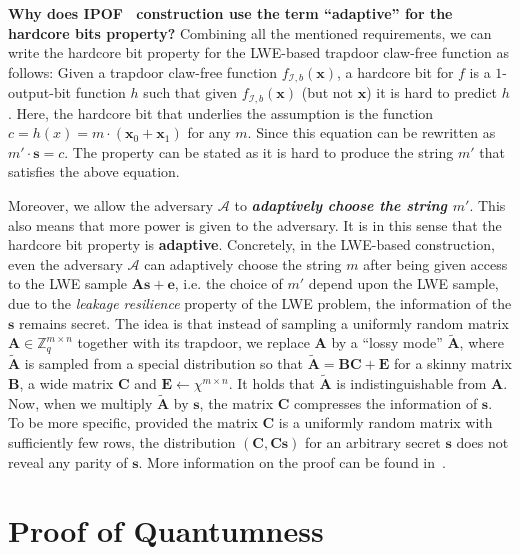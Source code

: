 \documentclass[cryptography,review,submit,pdftex,moreauthors,amsmath,amssymb,aps,strict]{Definitions/mdpi}
\begin{document}
\noindent\textbf{Why does IPOF~\cite{Brakerski18_Interactiveproofofquantumness} construction use the term ``adaptive'' for the hardcore bits property?}
Combining all the mentioned requirements, we can write the hardcore bit property for the LWE-based trapdoor claw-free function as follows:
Given a trapdoor claw-free function $f_{\mathcal{I},b}(\mathbf{x})$, a hardcore bit for $f$ is a $1$-output-bit function $h$ such that given  $f_{\mathcal{I},b}(\mathbf{x})$ (but not $\mathbf{x}$) it is hard to predict $h$. Here, the hardcore bit that underlies the assumption is the function $c = h(x)= m\cdot (\mathbf{x}_0 + \mathbf{x}_1)$ for any $m$.
Since this equation can be rewritten as $m'\cdot \mathbf{s} =c$. The property can be stated as it is hard to produce the string $m'$ that satisfies the above equation.

Moreover, we allow the adversary $\mathcal{A}$ to \textbf{\textit{adaptively choose the string $m'$}}. This also means that more power is given to the adversary. It is in this sense that the hardcore bit property is \textbf{adaptive}. Concretely, in the LWE-based construction, even the adversary $\mathcal{A}$ can adaptively choose the string $m$ after being given access to the LWE sample $\mathbf{A}\mathbf{s}+\mathbf{e}$, i.e. the choice of $m'$ depend upon the LWE sample, due to the \textit{leakage resilience} property of the LWE problem, the information of the $\mathbf{s}$ remains secret. The idea is that instead of sampling a uniformly random matrix $\mathbf{A}\in\mathbb{Z}^{m\times n}_q$ together with its trapdoor, we replace $\mathbf{A}$ by a ``lossy mode'' $\tilde{\mathbf{A}}$, where $\tilde{\mathbf{A}}$ is sampled from a special distribution so that $\tilde{\mathbf{A}}=\mathbf{B}\mathbf{C}+\mathbf{E}$ for a skinny matrix $\mathbf{B}$, a wide matrix $\mathbf{C}$ and $\mathbf{E}\gets\chi^{m\times n}$. It holds that $\tilde{\mathbf{A}}$ is indistinguishable from $\mathbf{A}$. Now, when we multiply $\tilde{\mathbf{A}}$ by $\mathbf{s}$, the matrix $\mathbf{C}$ compresses the information of $\mathbf{s}$. To be more specific, provided the matrix $\mathbf{C}$ is a uniformly random matrix with sufficiently few rows, the distribution $(\mathbf{C},\mathbf{C}\mathbf{s})$ for an arbitrary secret $\mathbf{s}$ does not reveal any parity of $\mathbf{s}$. More information on the proof can be found in~\cite{Brakerski18_Interactiveproofofquantumness}.

\section{Proof of Quantumness} \label{proof_of_quantumness}
\end{document}
